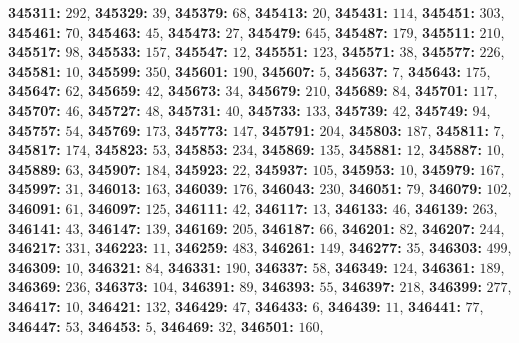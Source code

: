 \textsf{\bfseries 345311:} $292$, \textsf{\bfseries 345329:} $39$, \textsf{\bfseries 345379:} $68$, \textsf{\bfseries 345413:} $20$, \textsf{\bfseries 345431:} $114$, \textsf{\bfseries 345451:} $303$, \textsf{\bfseries 345461:} $70$, \textsf{\bfseries 345463:} $45$, \textsf{\bfseries 345473:} $27$, \textsf{\bfseries 345479:} $645$, \textsf{\bfseries 345487:} $179$, \textsf{\bfseries 345511:} $210$, \textsf{\bfseries 345517:} $98$, \textsf{\bfseries 345533:} $157$, \textsf{\bfseries 345547:} $12$, \textsf{\bfseries 345551:} $123$, \textsf{\bfseries 345571:} $38$, \textsf{\bfseries 345577:} $226$, \textsf{\bfseries 345581:} $10$, \textsf{\bfseries 345599:} $350$, \textsf{\bfseries 345601:} $190$, \textsf{\bfseries 345607:} $5$, \textsf{\bfseries 345637:} $7$, \textsf{\bfseries 345643:} $175$, \textsf{\bfseries 345647:} $62$, \textsf{\bfseries 345659:} $42$, \textsf{\bfseries 345673:} $34$, \textsf{\bfseries 345679:} $210$, \textsf{\bfseries 345689:} $84$, \textsf{\bfseries 345701:} $117$, \textsf{\bfseries 345707:} $46$, \textsf{\bfseries 345727:} $48$, \textsf{\bfseries 345731:} $40$, \textsf{\bfseries 345733:} $133$, \textsf{\bfseries 345739:} $42$, \textsf{\bfseries 345749:} $94$, \textsf{\bfseries 345757:} $54$, \textsf{\bfseries 345769:} $173$, \textsf{\bfseries 345773:} $147$, \textsf{\bfseries 345791:} $204$, \textsf{\bfseries 345803:} $187$, \textsf{\bfseries 345811:} $7$, \textsf{\bfseries 345817:} $174$, \textsf{\bfseries 345823:} $53$, \textsf{\bfseries 345853:} $234$, \textsf{\bfseries 345869:} $135$, \textsf{\bfseries 345881:} $12$, \textsf{\bfseries 345887:} $10$, \textsf{\bfseries 345889:} $63$, \textsf{\bfseries 345907:} $184$, \textsf{\bfseries 345923:} $22$, \textsf{\bfseries 345937:} $105$, \textsf{\bfseries 345953:} $10$, \textsf{\bfseries 345979:} $167$, \textsf{\bfseries 345997:} $31$, \textsf{\bfseries 346013:} $163$, \textsf{\bfseries 346039:} $176$, \textsf{\bfseries 346043:} $230$, \textsf{\bfseries 346051:} $79$, \textsf{\bfseries 346079:} $102$, \textsf{\bfseries 346091:} $61$, \textsf{\bfseries 346097:} $125$, \textsf{\bfseries 346111:} $42$, \textsf{\bfseries 346117:} $13$, \textsf{\bfseries 346133:} $46$, \textsf{\bfseries 346139:} $263$, \textsf{\bfseries 346141:} $43$, \textsf{\bfseries 346147:} $139$, \textsf{\bfseries 346169:} $205$, \textsf{\bfseries 346187:} $66$, \textsf{\bfseries 346201:} $82$, \textsf{\bfseries 346207:} $244$, \textsf{\bfseries 346217:} $331$, \textsf{\bfseries 346223:} $11$, \textsf{\bfseries 346259:} $483$, \textsf{\bfseries 346261:} $149$, \textsf{\bfseries 346277:} $35$, \textsf{\bfseries 346303:} $499$, \textsf{\bfseries 346309:} $10$, \textsf{\bfseries 346321:} $84$, \textsf{\bfseries 346331:} $190$, \textsf{\bfseries 346337:} $58$, \textsf{\bfseries 346349:} $124$, \textsf{\bfseries 346361:} $189$, \textsf{\bfseries 346369:} $236$, \textsf{\bfseries 346373:} $104$, \textsf{\bfseries 346391:} $89$, \textsf{\bfseries 346393:} $55$, \textsf{\bfseries 346397:} $218$, \textsf{\bfseries 346399:} $277$, \textsf{\bfseries 346417:} $10$, \textsf{\bfseries 346421:} $132$, \textsf{\bfseries 346429:} $47$, \textsf{\bfseries 346433:} $6$, \textsf{\bfseries 346439:} $11$, \textsf{\bfseries 346441:} $77$, \textsf{\bfseries 346447:} $53$, \textsf{\bfseries 346453:} $5$, \textsf{\bfseries 346469:} $32$, \textsf{\bfseries 346501:} $160$, 
